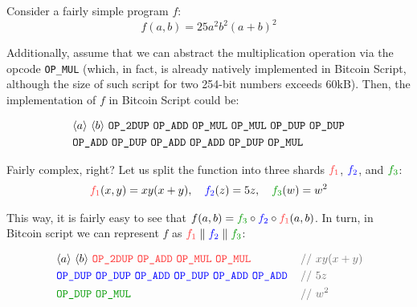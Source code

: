 \documentclass{iacrtrans}
\newcommand{\elem}[1]{\, \langle #1 \rangle \,}
\newcommand{\opcode}[1]{\, \texttt{#1} \,}
\begin{document}
\begin{example}
  Consider a fairly simple program $f$:
  \begin{equation*}
    f(a,b) = 25a^2b^2{(a+b)}^2
  \end{equation*}

  Additionally, assume that we can abstract the multiplication operation
  via the opcode \texttt{OP\_MUL} (which, in fact, is already natively
    implemented in Bitcoin Script, although the size of such script
  for two 254-bit numbers exceeds 60kB).
  Then, the implementation of $f$ in Bitcoin Script could be:
  \begin{empheqboxed}
    \begin{align*}
      &\elem{a} \elem{b} \opcode{\texttt{OP\_2DUP}}
      \opcode{\texttt{OP\_ADD}} \opcode{\texttt{OP\_MUL}}
      \opcode{\texttt{OP\_MUL}}
      \opcode{\texttt{OP\_DUP}} \opcode{\texttt{OP\_DUP}} \\&
      \opcode{\texttt{OP\_ADD}} \opcode{\texttt{OP\_DUP}}
      \opcode{\texttt{OP\_ADD}} \opcode{\texttt{OP\_ADD}}
      \opcode{\texttt{OP\_DUP}} \opcode{\texttt{OP\_MUL}}
    \end{align*}
  \end{empheqboxed}

  Fairly complex, right? Let us split the function into three shards
  $\textcolor{red!80!white}{f_1}$, $\textcolor{blue}{f_2}$, and
  $\textcolor{green!60!black}{f_3}$:
  \begin{align*}
    \textcolor{red!80!white}{f_1}(x,y) = xy(x+y), \quad
    \textcolor{blue}{f_2}(z) = 5z, \quad
    \textcolor{green!60!black}{f_3}(w) = w^2
  \end{align*}

  This way, it is fairly easy to see that $f(a,b) =
  \textcolor{green!60!black}{f_3} \circ \textcolor{blue}{f_2} \circ
  \textcolor{red!80!white}{f_1}(a,b)$. In turn, in Bitcoin
  script we can represent $f$ as $\textcolor{red!80!white}{f_1}
  \parallel \textcolor{blue}{f_2} \parallel \textcolor{green!60!black}{f_3}$:
  \begin{empheqboxed}
    \begin{align*}
      &\elem{a} \elem{b}
      \textcolor{red!80!white}{\opcode{\texttt{OP\_2DUP}}
        \opcode{\texttt{OP\_ADD}} \opcode{\texttt{OP\_MUL}}
      \opcode{\texttt{OP\_MUL}}} &&
      \textcolor{gray!80!black}{\text{// $xy(x+y)$}} \\
      &\textcolor{blue}{\opcode{\texttt{OP\_DUP}}
        \opcode{\texttt{OP\_DUP}} \opcode{\texttt{OP\_ADD}}
        \opcode{\texttt{OP\_DUP}} \opcode{\texttt{OP\_ADD}}
      \opcode{\texttt{OP\_ADD}}} && \textcolor{gray!80!black}{\text{// $5z$}} \\
      &\textcolor{green!60!black}{\opcode{\texttt{OP\_DUP}}
      \opcode{\texttt{OP\_MUL}}}&&\textcolor{gray!80!black}{\text{// $w^2$}}
    \end{align*}
  \end{empheqboxed}
\end{example}
\end{document}
